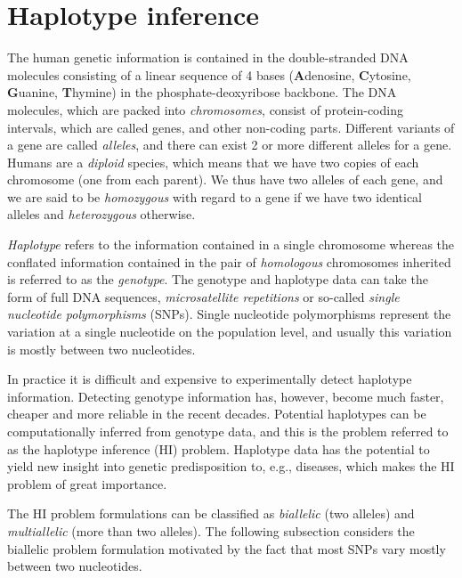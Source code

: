 \documentclass[12pt,a4paper]{article}
\begin{document}
\section{Haplotype inference}
\label{sec:hipp}
The human genetic information is contained in the double-stranded DNA molecules consisting of a linear sequence of 4 bases (\textbf{A}denosine, \textbf{C}ytosine, \textbf{G}uanine, \textbf{T}hymine) in the phosphate-deoxyribose backbone.
The DNA molecules, which are packed into \emph{chromosomes}, consist of protein-coding intervals, which are called genes, and other non-coding parts.
Different variants of a gene are called \emph{alleles}, and there can exist 2 or more different alleles for a gene.
Humans are a \emph{diploid} species, which means that we have two copies of each chromosome (one from each parent).
We thus have two alleles of each gene, and we are said to be \emph{homozygous} with regard to a gene if we have two identical alleles and \emph{heterozygous} otherwise.

\emph{Haplotype} refers to the information contained in a single chromosome whereas the conflated information contained in the pair of  \emph{homologous} chromosomes inherited is referred to as the \emph{genotype}.
The genotype and haplotype data can take the form of full DNA sequences, \emph{microsatellite repetitions} or so-called \emph{single nucleotide polymorphisms} (SNPs).
Single nucleotide polymorphisms represent the variation at a single nucleotide on the population level, and usually this variation is mostly between two nucleotides.

In practice it is difficult and expensive to experimentally detect haplotype information.
Detecting genotype information has, however, become much faster, cheaper and more reliable in the recent decades.
Potential haplotypes can be computationally inferred from genotype data, and this is the problem referred to as the haplotype inference (HI) problem.
Haplotype data has the potential to yield new insight into genetic predisposition to, e.g., diseases, which makes the HI problem of great importance.

The HI problem formulations can be classified as \emph{biallelic} (two alleles) and \emph{multiallelic} (more than two alleles).
The following subsection considers the biallelic problem formulation motivated by the fact that most SNPs vary mostly between two nucleotides.
\end{document}
